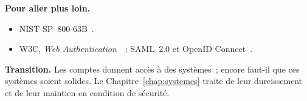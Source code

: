 \begin{boxinfo}
\textbf{Pour aller plus loin.}
\begin{itemize}
    \item NIST SP~800-63B~\cite{nist80063b}.
    \item W3C, \emph{Web Authentication}~\cite{w3c2019webauthn}~; SAML~2.0
          et OpenID Connect~\cite{oasis2005saml,oidc2014}.
\end{itemize}
\end{boxinfo}

\begin{boxinfo}
\textbf{Transition.} Les comptes donnent accès à des systèmes~; encore
faut-il que ces systèmes soient solides. Le Chapitre~\ref{chap:systemes}
traite de leur durcissement et de leur maintien en condition de sécurité.
\end{boxinfo}
